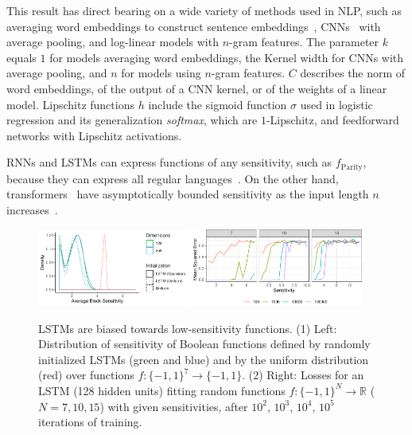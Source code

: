 \documentclass[11pt,a4paper]{article}
\begin{document}
This result has direct bearing on a wide variety of methods used in NLP, such as averaging word embeddings to construct sentence embeddings~\cite{wieting2015towards, arora2016simple, ethayarajh2018unsupervised}, CNNs~\citep{kim2014convolutional} with average pooling,
 and log-linear models with $n$-gram features.
The parameter $k$ equals $1$ for models averaging word embeddings, the Kernel width for CNNs with average pooling, and $n$ for models using $n$-gram features.
$C$ describes the norm of word embeddings, of the output of a CNN kernel, or of the weights of a linear model.
Lipschitz functions $h$ include the sigmoid function $\sigma$ used in logistic regression and its generalization \textit{softmax}, which are $1$-Lipschitz, and feedforward networks with Lipschitz activations.



RNNs and LSTMs \citep{hochreiter1997long} can express functions of any sensitivity, such as $f_{\text{Parity}}$, because they can express all regular languages~\citep{horne1994bounds}.
On the other hand, transformers~\citep{vaswani2017attention} have asymptotically bounded sensitivity as the input length $n$ increases~\citep[Lemma 5]{hahn2020theoretical}. %


\begin{figure}
    \centering
\includegraphics[width=0.45\textwidth]{code/learnability/output/lstm-init-s1.pdf}
\includegraphics[width=0.5\textwidth]{code/learnability/output/learnability3_together.pdf}
	\caption{LSTMs are biased towards low-sensitivity functions. (1) Left: Distribution of sensitivity of Boolean functions defined by randomly initialized LSTMs (green and blue) and by the uniform distribution (red) over functions $f : \{-1,1\}^7 \rightarrow \{-1,1\}$. (2) Right: Losses for an LSTM (128 hidden units) fitting random functions $f : \{-1,1\}^{N} \rightarrow \mathbb{R}$ ($N=7, 10, 15$) with given sensitivities, after $10^2$, $10^3$, $10^4$, $10^5$ iterations of training.}
    \label{fig:learnability}
\end{figure}
\end{document}
